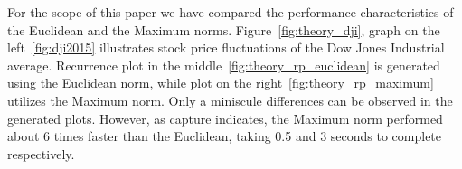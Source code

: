 \documentclass[a4paper,12pt,fleqn]{article}
\begin{document}
For the scope of this paper we have compared the performance characteristics of the Euclidean and the Maximum norms.
Figure~\ref{fig:theory_dji}, graph on the left~\ref{fig:dji2015} illustrates stock price fluctuations of the Dow Jones Industrial average.
Recurrence plot in the middle~\ref{fig:theory_rp_euclidean} is generated using the Euclidean norm, while plot on the right~\ref{fig:theory_rp_maximum} utilizes the Maximum norm.
Only a miniscule differences can be observed in the generated plots.
However, as capture indicates, the Maximum norm performed about 6 times faster than the Euclidean, taking 0.5 and 3 seconds to complete respectively.
























\end{document}
